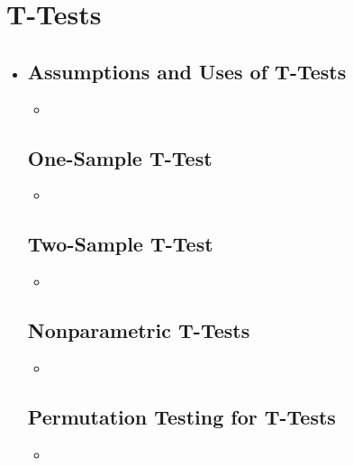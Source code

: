 \section{T-Tests}
\begin{itemize}
  \item []
  
  \subsection{Assumptions and Uses of T-Tests}
  \begin{itemize}
    \item 
  \end{itemize}

  \subsection{One-Sample T-Test}
  \begin{itemize}
    \item 
  \end{itemize}
  
  \subsection{Two-Sample T-Test}
  \begin{itemize}
    \item 
  \end{itemize}

  \subsection{Nonparametric T-Tests}
  \begin{itemize}
    \item 
  \end{itemize}
  
  \subsection{Permutation Testing for T-Tests}
  \begin{itemize}
    \item 
  \end{itemize}
  
  
\end{itemize}
